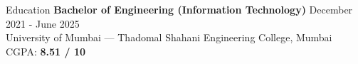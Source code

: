 \documentclass{resume} %
\begin{document}



\begin{rSection}{Education}
    {\bf Bachelor of Engineering (Information Technology)} \hfill {December 2021 - June 2025 } \\
    University of Mumbai — Thadomal Shahani Engineering College, Mumbai  \hfill CGPA: {\bf 8.51 / 10}


\end{rSection}
\end{document}
